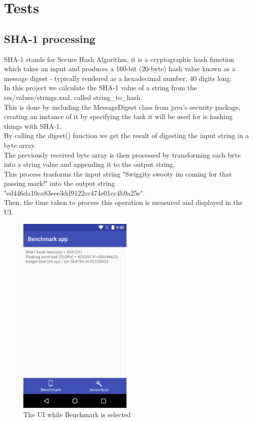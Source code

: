 \documentclass[a4paper,10pt]{report}
\begin{document}
 \section{Tests}
 \subsection{SHA-1 processing}
 SHA-1 stands for Secure Hash Algorithm, it is a cryptographic hash function which takes an input and produces a 160-bit (20-byte) hash value known as a message digest - typically rendered as a hexadecimal number, 40 digits long.\\
 In this project we calculate the SHA-1 value of a string from the res/values/strings.xml, called string\_to\_hash.\\
 This is done by including the MessageDigest class from java's security package, creating an instance of it by specifying the task it will be used for is hashing things with SHA-1.\\
 By calling the digest() function we get the result of digesting the input string in a byte array.\\
 The previously received byte array is then processed by transforming each byte into a string value and appending it to the output string.\\
 This process trasforms the input string "Swiggity swooty im coming for that passing mark!" into the output string "ed446da10ca83eee3dd9122cc474e01cc4b9a25e".\\
 Then, the time taken to process this operation is measured and displayed in the UI.
 
 
 \begin{figure}[h]
  \centering
  \includegraphics[width=0.5\textwidth]{Screenshot_20180523-214203.png}
  \caption{The UI while Benchmark is selected}
  \label{fig:uiBench}
  
 \end{figure}
 
\end{document}
